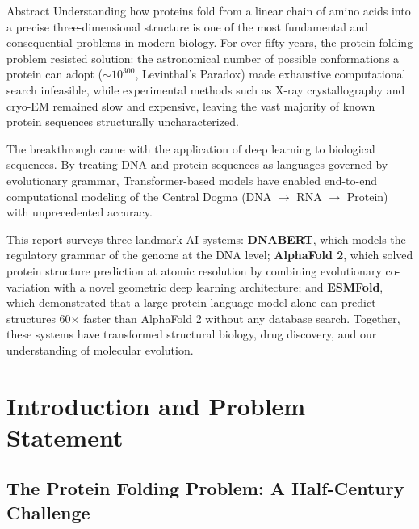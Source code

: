 ﻿\documentclass[12pt,a4paper]{article}
\begin{document}
\begin{keybox}{Abstract}
Understanding how proteins fold from a linear chain of amino acids into a precise three-dimensional structure is one of the most fundamental and consequential problems in modern biology. For over fifty years, the protein folding problem resisted solution: the astronomical number of possible conformations a protein can adopt ($\sim10^{300}$, Levinthal's Paradox) made exhaustive computational search infeasible, while experimental methods such as X-ray crystallography and cryo-EM remained slow and expensive, leaving the vast majority of known protein sequences structurally uncharacterized.

The breakthrough came with the application of deep learning to biological sequences. By treating DNA and protein sequences as languages governed by evolutionary grammar, Transformer-based models have enabled end-to-end computational modeling of the Central Dogma (DNA $\rightarrow$ RNA $\rightarrow$ Protein) with unprecedented accuracy.

This report surveys three landmark AI systems: \textbf{DNABERT}, which models the regulatory grammar of the genome at the DNA level; \textbf{AlphaFold 2}, which solved protein structure prediction at atomic resolution by combining evolutionary co-variation with a novel geometric deep learning architecture; and \textbf{ESMFold}, which demonstrated that a large protein language model alone can predict structures 60$\times$ faster than AlphaFold 2 without any database search. Together, these systems have transformed structural biology, drug discovery, and our understanding of molecular evolution.
\end{keybox}

\newpage
\tableofcontents
\newpage

\section{Introduction and Problem Statement}

\subsection{The Protein Folding Problem: A Half-Century Challenge}
\end{document}

